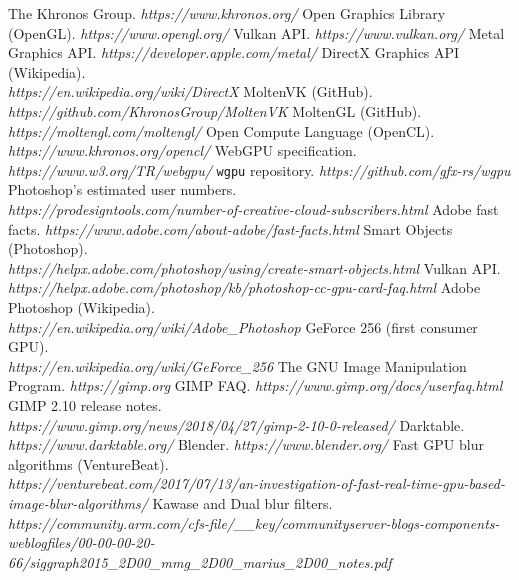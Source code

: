 \documentclass[12pt]{article}
\begin{document}
\begin{thebibliography}{99}

     The Khronos Group. \emph{https://www.khronos.org/}
     Open Graphics Library (OpenGL). \emph{https://www.opengl.org/}
     Vulkan API. \emph{https://www.vulkan.org/}
     Metal Graphics API. \emph{https://developer.apple.com/metal/}
     DirectX Graphics API (Wikipedia). \\
        \emph{https://en.wikipedia.org/wiki/DirectX}
     MoltenVK (GitHub). \emph{https://github.com/KhronosGroup/MoltenVK}
     MoltenGL (GitHub). \emph{https://moltengl.com/moltengl/}
     Open Compute Language (OpenCL). \emph{https://www.khronos.org/opencl/}
     WebGPU specification. \emph{https://www.w3.org/TR/webgpu/}
     \verb|wgpu| repository. \emph{https://github.com/gfx-rs/wgpu}
     Photoshop's estimated user numbers. \\
        \emph{https://prodesigntools.com/number-of-creative-cloud-subscribers.html}
     Adobe fast facts. \emph{https://www.adobe.com/about-adobe/fast-facts.html}
     Smart Objects (Photoshop). \\
        \emph{https://helpx.adobe.com/photoshop/using/create-smart-objects.html}
     Vulkan API. \\
        \emph{https://helpx.adobe.com/photoshop/kb/photoshop-cc-gpu-card-faq.html}
     Adobe Photoshop (Wikipedia). \\
        \emph{https://en.wikipedia.org/wiki/Adobe\_Photoshop}
     GeForce 256 (first consumer GPU). \\
        \emph{https://en.wikipedia.org/wiki/GeForce\_256}
     The GNU Image Manipulation Program. \emph{https://gimp.org}
     GIMP FAQ. \emph{https://www.gimp.org/docs/userfaq.html}
     GIMP 2.10 release notes. \\
        \emph{https://www.gimp.org/news/2018/04/27/gimp-2-10-0-released/}
     Darktable. \emph{https://www.darktable.org/}
     Blender. \emph{https://www.blender.org/}
     Fast GPU blur algorithms (VentureBeat). \\
        \emph{https://venturebeat.com/2017/07/13/an-investigation-of-fast-real-time-gpu-based-image-blur-algorithms/}
     Kawase and Dual blur filters. \\
        \emph{https://community.arm.com/cfs-file/\_\_key/communityserver-blogs-components-weblogfiles/00-00-00-20-66/siggraph2015\_2D00\_mmg\_2D00\_marius\_2D00\_notes.pdf}

\end{thebibliography}
\end{document}

